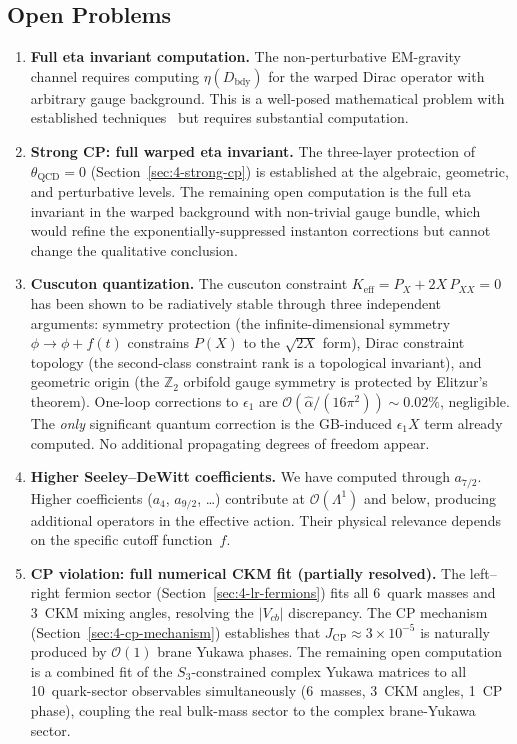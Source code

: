 \subsection{Open Problems}
\label{sec:4-open}

\begin{enumerate}
  \item \textbf{Full eta invariant computation.} The non-perturbative EM-gravity channel requires computing $\eta(D_{\mathrm{bdy}})$ for the warped Dirac operator with arbitrary gauge background. This is a well-posed mathematical problem with established techniques~\cite{ch4:APS1975b,ch4:APS1976} but requires substantial computation.

  \item \textbf{Strong CP: full warped eta invariant.} The three-layer protection of $\theta_{\mathrm{QCD}} = 0$ (Section~\ref{sec:4-strong-cp}) is established at the algebraic, geometric, and perturbative levels.  The remaining open computation is the full eta invariant in the warped background with non-trivial gauge bundle, which would refine the exponentially-suppressed instanton corrections but cannot change the qualitative conclusion.

  \item \textbf{Cuscuton quantization.} The cuscuton constraint $K_{\mathrm{eff}} = P_X + 2X\, P_{XX} = 0$ has been shown to be radiatively stable through three independent arguments: symmetry protection (the infinite-dimensional symmetry $\phi \to \phi + f(t)$ constrains $P(X)$ to the $\sqrt{2X}$ form), Dirac constraint topology (the second-class constraint rank is a topological invariant), and geometric origin (the $\mathbb{Z}_2$ orbifold gauge symmetry is protected by Elitzur's theorem). One-loop corrections to $\epsilon_1$ are $\mathcal{O}(\hat{\alpha}/(16\pi^2)) \sim 0.02\%$, negligible. The \emph{only} significant quantum correction is the GB-induced $\epsilon_1 X$ term already computed. No additional propagating degrees of freedom appear.

  \item \textbf{Higher Seeley--DeWitt coefficients.} We have computed through $a_{7/2}$. Higher coefficients ($a_4$, $a_{9/2}$, \ldots) contribute at $\mathcal{O}(\Lambda^1)$ and below, producing additional operators in the effective action. Their physical relevance depends on the specific cutoff function~$f$.

  \item \textbf{CP violation: full numerical CKM fit (partially resolved).} The left--right fermion sector (Section~\ref{sec:4-lr-fermions}) fits all 6~quark masses and 3~CKM mixing angles, resolving the $|V_{cb}|$ discrepancy.  The CP mechanism (Section~\ref{sec:4-cp-mechanism}) establishes that $J_{\mathrm{CP}} \approx 3 \times 10^{-5}$ is naturally produced by $\mathcal{O}(1)$ brane Yukawa phases.  The remaining open computation is a combined fit of the $S_3$-constrained complex Yukawa matrices to all 10~quark-sector observables simultaneously (6~masses, 3~CKM angles, 1~CP phase), coupling the real bulk-mass sector to the complex brane-Yukawa sector.


\end{enumerate}
